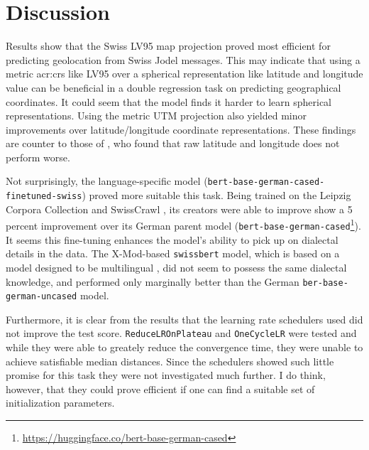 \section{Discussion}
\label{sec:Discussion}

\begin{comment}
It is important to include a discussion, which describes what you have learned so far, the merits of the work as well as its limitations.
It can be a separate section or it can appear together with the results or be part of the conclusion).
When evaluating your results, avoid drawing grand conclusions, beyond those that your results can in fact support.
Further, although you may have designed your experiments to answer certain questions,
the results may raise other questions in the eyes of the reader.
It is important that you study the graphs/tables to look for unusual features/entries, and discuss these as well as the main findings.
In particular, carry out an error analysis: b went wrong and why?
\end{comment}

Results show that the Swiss LV95 map projection proved most efficient for predicting geolocation from Swiss Jodel messages. This may indicate that using a metric \gls{acr:crs} like LV95 over a spherical representation like latitude and longitude value can be beneficial in a double regression task on predicting geographical coordinates. It could seem that the model finds it harder to learn spherical representations. Using the metric UTM projection also yielded minor improvements over latitude/longitude coordinate representations. These findings are counter to those of \cite[5]{scherrerHeLjuVarDial20202020}, who found that raw latitude and longitude does not perform worse.

Not surprisingly, the language-specific model (\texttt{bert-base-german-cased-finetuned-swiss}) proved more suitable this task. Being trained on the Leipzig Corpora Collection \citep{goldhahnBuildingLargeMonolingual} and SwissCrawl \citep{linderAutomaticCreationText2020}, its creators were able to improve show a 5 percent improvement over its German parent model (\texttt{bert-base-german-cased}\footnote{\url{https://huggingface.co/bert-base-german-cased}}). It seems this fine-tuning enhances the model's ability to pick up on dialectal details in the data. The X-Mod-based \texttt{swissbert} model, which is based on a model designed to be multilingual \citep{pfeifferLiftingCurseMultilinguality2022}, did not seem to possess the same dialectal knowledge, and performed only marginally better than the German \texttt{ber-base-german-uncased} model.

Furthermore, it is clear from the results that the learning rate schedulers used did not improve the test score. \texttt{ReduceLROnPlateau} and \texttt{OneCycleLR} were tested and while they were able to greately reduce the convergence time, they were unable to achieve satisfiable median distances. Since the schedulers showed such little promise for this task they were not investigated much further. I do think, however, that they could prove efficient if one can find a suitable set of initialization parameters.
